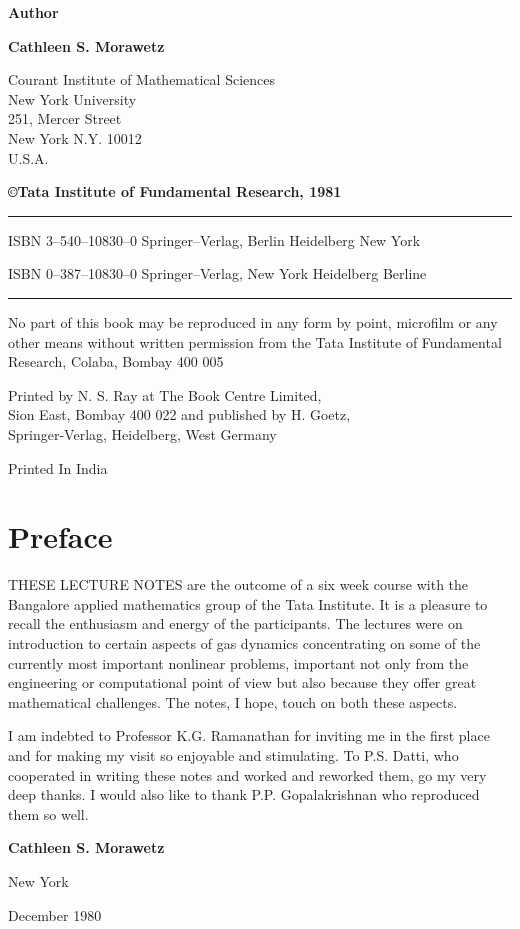 \thispagestyle{empty}
\begin{center}
{\bf Author}
\medskip

{\large\bf Cathleen S. Morawetz}
\bigskip

Courant Institute of Mathematical Sciences\\
New York University\\
251, Mercer Street\\
New York N.Y. 10012\\
U.S.A.
\vfill

{\bf\copyright \quad Tata Institute of Fundamental Research, 1981}
\vfill

\noindent\rule{\textwidth}{1pt}

ISBN 3--540--10830--0 Springer--Verlag, Berlin Heidelberg New York

\medskip

ISBN 0--387--10830--0 Springer--Verlag, New York Heidelberg Berline

\noindent\rule{\textwidth}{1pt}
\medskip

\parbox{0.7\textwidth}{No part of this book may be reproduced in any
  form  by point, microfilm or any other means without 
written permission from the Tata Institute of 
Fundamental Research, Colaba, Bombay 400 005}
\vfill

Printed by N. S. Ray at The Book Centre Limited, \\
Sion East, Bombay 400 022 and published by H. Goetz,\\
Springer-Verlag, Heidelberg, West Germany\\
\vfill

Printed In India
\end{center}



\chapter{Preface}


THESE LECTURE NOTES are the outcome of a six week course with the
Bangalore applied mathematics group of the Tata Institute. It is a
pleasure to recall the enthusiasm and energy of the participants. The
lectures were on introduction to certain aspects of gas dynamics
concentrating on some of the currently most important nonlinear
problems, important not only from the engineering or computational
point of view but also because they offer great mathematical
challenges. The notes, I hope, touch on both these aspects. 


I am indebted to Professor K.G. Ramanathan for inviting me in the
first place and for making my visit so enjoyable and stimulating. To
P.S. Datti, who cooperated in writing these notes and worked and
reworked them, go my very deep thanks. I would also like to thank
P.P. Gopalakrishnan who reproduced them so well. 
\bigskip


\begin{flushright}
{\large\bf Cathleen S. Morawetz}
\medskip


New York

December 1980
\end{flushright}


